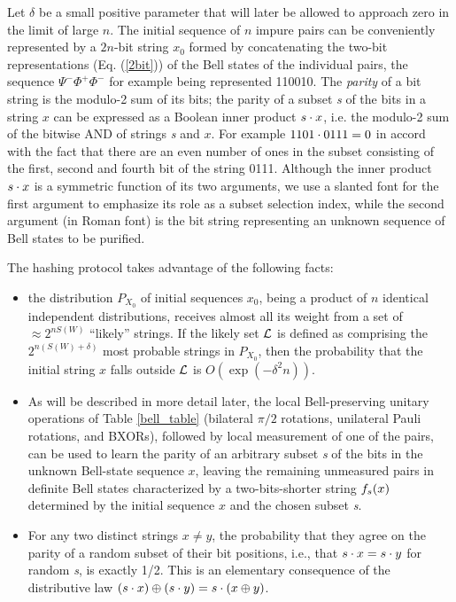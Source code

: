 Let $\delta$ be a small positive parameter that will later be allowed
to approach zero in the limit of large $n$. The initial sequence of
$n$ impure pairs can be conveniently represented by a $2n$-bit string
$x_0$ formed by concatenating the two-bit representations
(Eq. (\ref{2bit})) of the Bell states of the individual pairs, the
sequence $\Psi^-\Phi^+\Phi^-$ for example being represented 110010.
The {\em parity\/} of a bit string is the modulo-2 sum of its bits;
the parity of a subset {\sl s} of the bits in a string $x$ can be
expressed as a Boolean inner product ${\sl s}\cdot x$, i.e. the
modulo-2 sum of the bitwise AND of strings {\sl s} and $x$.  For
example ${\sl 1101}\cdot0111=0$ in accord with the fact that there are
an even number of ones in the subset consisting of the first, second
and fourth bit of the string 0111.  Although the inner product ${\sl
s}\cdot x$ is a symmetric function of its two arguments, we use a
slanted font for the first argument to emphasize its role as a subset
selection index, while the second argument (in Roman font) is the bit
string representing an unknown sequence of Bell states to be purified.
 
The hashing protocol takes advantage of the following facts:
\begin{itemize}
\item
the distribution $P_{X_0}$ of initial sequences $x_0$, being a product
of $n$ identical independent distributions, receives almost all its weight from
a set of $\approx2^{nS(W)}$ ``likely'' strings. If the likely
set ${\cal L}$ is defined as comprising the $2^{n(S(W)+\delta)}$ most
probable strings in $P_{X_0}$, then the probability that the initial
string $x$ falls outside ${\cal L}$ is
$O(\exp(-\delta^2n))$\cite{Schu}.
\item
As will be described in more detail later, the local Bell-preserving
unitary operations of Table \ref{bell_table} (bilateral $\pi/2$
rotations, unilateral Pauli rotations, and BXORs), followed by local
measurement of one of the pairs, can be used to learn the parity of an
arbitrary subset {\sl s} of the bits in the unknown Bell-state sequence
$x$, leaving the remaining unmeasured pairs in definite Bell states
characterized by a two-bits-shorter string $f_{\sl s}(x)$
determined by the initial sequence $x$ and the chosen subset {\sl
s}.
\item
For any two distinct strings $x\neq y$, the probability that they
agree on the parity of a random subset of their bit positions, i.e.,
that ${\sl s}\cdot x={\sl s}\cdot y$ for random {\sl s}, is
exactly 1/2. This is an elementary consequence of the distributive law
$({\sl s}\cdot x) \oplus ({\sl s}\cdot y) = {\sl
s}\cdot(x\oplus y)$.
\end{itemize}
 
